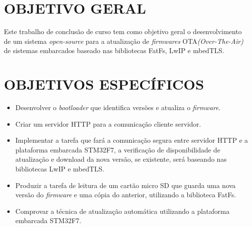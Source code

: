 



\section{OBJETIVO GERAL}
\label{sec:Objetivo Geral}

Este trabalho de conclusão de curso tem como objetivo geral o desenvolvimento de um sistema \textit{open-source} para a atualização  de \textit{firmwares} OTA\textit{(Over-The-Air)} de sistemas embarcados baseado nas bibliotecas FatFs, LwIP e mbedTLS. 

\section{OBJETIVOS ESPECÍFICOS}
\label{sec:Objetivos Específicos}

 \begin{itemize}
   \item Desenvolver o \textit{bootloader} que identifica versões e atualiza o \textit{firmware}.
   
   \item Criar um servidor HTTP para a comunicação cliente servidor.
   
   \item Implementar a tarefa que fará a comunicação segura entre servidor HTTP e a plataforma embarcada STM32F7, a verificação de disponibilidade de atualização e download da nova versão, se existente, será baseando nas bibliotecas LwIP e mbedTLS. 
   
   \item  Produzir a tarefa de leitura de um cartão micro SD que guarda uma nova versão do \textit{firmware} e uma cópia do anterior, utilizando a biblioteca FatFs.
   
   \item Comprovar a técnica de atualização automática utilizando a plataforma embarcada STM32F7.
   
 \end{itemize}
 
